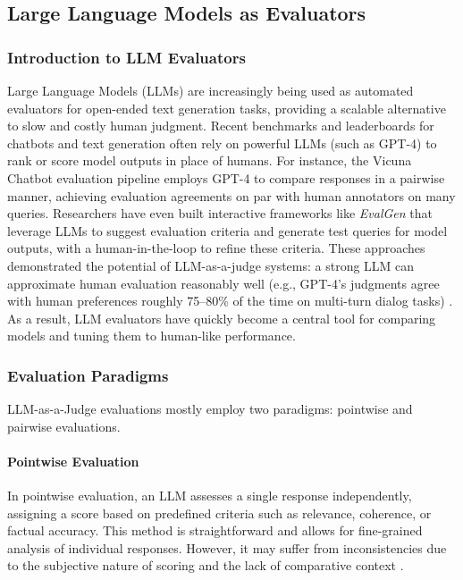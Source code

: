 \documentclass[sigconf, authoryear]{acmart}
\begin{document}
\subsection{Large Language Models as Evaluators}\label{subsec:large-language-models-as-evaluators}

\subsubsection{Introduction to LLM Evaluators}

Large Language Models (LLMs) are increasingly being used as automated evaluators for open-ended text generation tasks, providing a scalable alternative to slow and costly human judgment.
Recent benchmarks and leaderboards for chatbots and text generation often rely on powerful LLMs (such as GPT-4) to rank or score model outputs in place of humans.
For instance, the Vicuna Chatbot evaluation pipeline employs GPT-4 to compare responses in a pairwise manner, achieving evaluation agreements on par with human annotators on many queries.
Researchers have even built interactive frameworks like \textit{EvalGen} \cite{evalgen} that leverage LLMs to suggest evaluation criteria and generate test queries for model outputs, with a human-in-the-loop to refine these criteria.
These approaches demonstrated the potential of LLM-as-a-judge systems: a strong LLM can approximate human evaluation reasonably well (e.g., GPT-4’s judgments agree with human preferences roughly 75–80\% of the time on multi-turn dialog tasks) \cite{mtbench}.
As a result, LLM evaluators have quickly become a central tool for comparing models and tuning them to human-like performance.

\subsubsection{Evaluation Paradigms}


LLM-as-a-Judge evaluations mostly employ two paradigms: pointwise and pairwise evaluations.

\paragraph{Pointwise Evaluation}


In pointwise evaluation, an LLM assesses a single response independently, assigning a score based on predefined criteria such as relevance, coherence, or factual accuracy.
This method is straightforward and allows for fine-grained analysis of individual responses.
However, it may suffer from inconsistencies due to the subjective nature of scoring and the lack of comparative context \cite{evalgen}.
\end{document}
